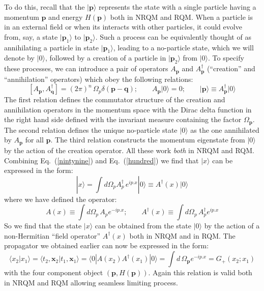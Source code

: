 \documentclass{article}
\def\eq#1{{Eq.~(\ref{#1})}}
\def\ket#1{|#1\rangle}                    %
\def\bk#1#2#3{{\langle #1|#2|#3\rangle}}  %
\def\amp#1#2{\langle #1 | #2\rangle}      %
\begin{document}
 To do this, recall that the $\ket{\bm{p}}$ represents the state with a single particle having a momentum $\bm{p}$ and energy $H(\bm{p})$ both in NRQM and RQM. When  a particle is in an external field or when its interacts with other particles, it could evolve from, say, a state 
 $\ket{\bm{p}_1}$ to $\ket{\bm{p}_2}$.  Such a process can be equivalently thought of as annihilating a particle in state $\ket{\bm{p}_1}$, leading to a no-particle state, which we will denote by $\ket{0}$, followed by a creation of a particle in  $\ket{\bm{p}_2}$ from $\ket{0}$. To specify these processes, we can
 introduce a pair of operators $A_{\bm{p}}$ and $A^\dagger_{\bm{p}}$ (``creation'' and ``annihilation'' operators) which obey the following relations: 
\begin{equation}
\left[  A_{\bm{p}}, A^\dagger_{\bm{q}}\right] = (2\pi)^n \, \Omega_p \delta (\bm{p}- \bm{q});
 \qquad A_{\bm{p}}\ket{0}=0;  \qquad  \ket{\bm{p}} \equiv A^\dagger_{\bm{p}}\ket{0} 
 \label{hundred}
\end{equation} 
  The first relation defines the commutator structure of the creation and annihilation operators in the momentum space with the Dirac delta function in the right hand side defined with the invariant measure containing the factor $\Omega_{\bm{p}}$. The second relation defines the unique no-particle state $\ket{0}$ as the one annihilated by $A_{\bm{p}}$ for all $\bm{p}$. The third relation constructs the momentum eigenstate from $\ket{0} $ by the action of the creation operator. All these work \textit{both} in NRQM and RQM.
   Combining \eq{nintynine} and \eq{hundred} we find that $\ket{x}$ can be expressed in the form:
\begin{equation}
 \ket{x} =  \int d\Omega_p  A^\dagger_p \, e^{ip.x}\ket{0} \equiv A^\dagger(x)\ket{0} 
\end{equation}
where we have defined the operator:
\begin{equation}
 A(x) \equiv \int d\Omega_p \, A_p e^{-ip.x};\qquad A^\dagger(x) \equiv \int d\Omega_p \, A_p^\dagger e^{ip.x}
 \label{fop1}
\end{equation} 
  So we find that the state $\ket{x}$ can be obtained from the state $\ket{0}$ by the action of a 
  non-Hermitian ``field operator'' $A^\dagger(x)$ both in NRQM and in RQM. The propagator we obtained earlier can now be expressed in the form:
  \begin{equation}
   \amp{x_2}{x_1}=\amp{t_2,\bm{x}_2}{t_1,\bm{x}_1}=\bk{0}{A(x_2)A^\dagger(x_1)}{0}
   =\int d\,\Omega_{\bm{p}}e^{-ip.x}= G_+(x_2;x_1)
   \label{fourfour}
  \end{equation} 
 with the four component object $(\bm{p},H(\bm{p}))$. Again this relation is valid both in NRQM and RQM allowing seamless limiting process. 
 
\end{document}
